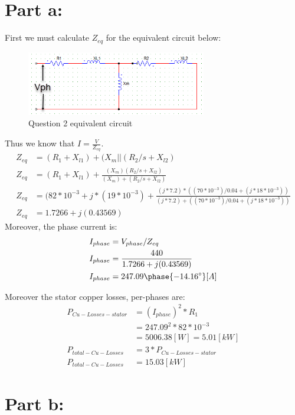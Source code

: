 \documentclass{article}
\begin{document}
\section*{Part a:}
First we must calculate $Z_{eq}$ for the equivalent circuit below:
\begin{figure}[H]
    \centering
    \includegraphics[width=0.7\textwidth]{q2-1.png}
    \caption{Question 2 equivalent circuit}
\end{figure}
Thus we know that $I = \frac{V}{Z_{eq}}$.
\begin{align*}
    Z_{eq} &= (R_1 + X_{l1}) + ( X_m || (R_2/s + X_{l2}) \\
    Z_{eq} &= (R_1 + X_{l1}) + \frac{(X_m) (R_2/s + X_{l2})}{(X_m) + (R_2/s + X_{l2})}\\
    Z_{eq} &= (82*10^{-3} + j*(19*10^{-3}) + \frac{(j*7.2)*((70*10^{-3})/0.04 + (j*18*10^{-3}))}{(j*7.2) + ((70*10^{-3})/0.04 + (j*18*10^{-3}))}\\
    Z_{eq} &= 1.7266 + j(0.43569)
\end{align*}
Moreover, the phase current is: 
\begin{align*}
    I_{phase} &= V_{phase} / Z_{eq}\\
    I_{phase} &= \frac{440}{1.7266 + j(0.43569)}\\
    I_{phase} &= 247.09 \phase{-14.16^{\circ}} [A]
\end{align*}

Moreover the stator copper losses, per-phases are:
\begin{align*}
    P_{Cu-Losses-stator} &= (I_{phase})^2 * R_1 \\
    &= 247.09^2 * 82*10^{-3}\\
    &= 5006.38 [W] = 5.01 [kW]\\
    P_{total-Cu-Losses} &= 3 * P_{Cu-Losses-stator} \\
    P_{total-Cu-Losses} &= 15.03 [kW]
\end{align*}
\section*{Part b:}
\end{document}
